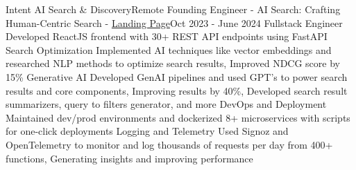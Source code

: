 \resumeSubHeadingListEnd
\resumeSubheading
{Intent AI Search \& Discovery}{Remote}
{Founding Engineer - AI Search: Crafting Human-Centric Search - \href{https://intenthq.ai/}{Landing Page}}{Oct 2023 - June 2024}
\resumeItemListStart
\resumeItem
{Fullstack Engineer}
{Developed ReactJS frontend with 30+ REST API endpoints using FastAPI}
\resumeItem
{Search Optimization}
{Implemented AI techniques like vector embeddings and researched NLP methods to optimize search results, Improved NDCG score by 15\%}
\resumeItem
{Generative AI}
{Developed GenAI pipelines and used GPT's to power search results and core components, Improving results by 40\%, Developed search result summarizers, query to filters generator, and more}
\resumeItem
{DevOps and Deployment}
{Maintained dev/prod environments and dockerized 8+ microservices with scripts for one-click deployments}
\resumeItem
{Logging and Telemetry}
{Used Signoz and OpenTelemetry to monitor and log thousands of requests per day from 400+ functions, Generating insights and improving performance}
\resumeItemListEnd

\resumeSubHeadingListEnd

